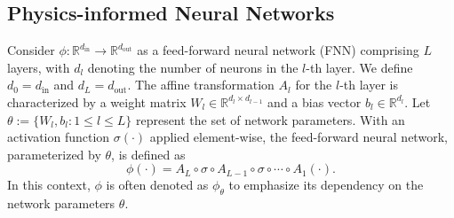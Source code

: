 \documentclass[preprint,12pt]{elsarticle}
\begin{document}
\subsection{Physics-informed Neural Networks}
Consider $\phi : \mathbb{R}^{d_\mathrm{in}} \rightarrow \mathbb{R}^{d_\mathrm{out}}$ as a feed-forward neural network (FNN) comprising $L$ layers, with $d_l$ denoting the number of neurons in the $l$-th layer.
We define $d_0 = d_\mathrm{in}$ and $d_L = d_\mathrm{out}$.
The affine transformation $A_l$ for the $l$-th layer is characterized by a weight matrix $W_l \in \mathbb{R}^{d_l \times d_{l-1}}$ and a bias vector $b_l \in \mathbb{R}^{d_l}$.
Let $\theta := \{ W_l, b_l: 1 \le l \le L\}$ represent the set of network parameters. With an activation function $\sigma(\cdot)$ applied element-wise, the feed-forward neural network, parameterized by $\theta$, is defined as
\[
    \phi(\cdot) = A_L \circ \sigma \circ A_{L-1} \circ \sigma \circ \cdots \circ A_1 (\cdot).
\]
In this context, $\phi$ is often denoted as $\phi_\theta$ to emphasize its dependency on the network parameters $\theta$.
\end{document}
